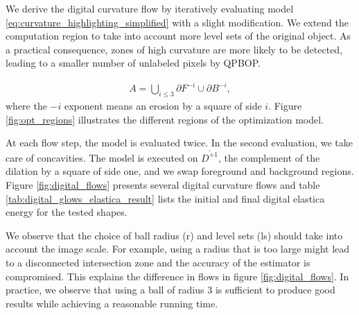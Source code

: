 \documentclass[runningheads]{llncs}
\begin{document}
We derive the digital curvature flow by iteratively evaluating model \eqref{eq:curvature_highlighting_simplified} with a
slight modification. We extend the computation region to take into account more level sets of the original object. As a
practical consequence, zones of high curvature are more likely to be detected, leading to a smaller number of unlabeled
pixels by QPBOP.

\begin{align*}
	A = \bigcup_{i\leq3}{ \partial F^{-i} \cup \partial B^{-i} },
\end{align*}
where the $-i$ exponent means an erosion by a square of side $i$. Figure \ref{fig:opt_regions} illustrates the different regions of the optimization model. 

At each flow step, the model is evaluated twice. In the second evaluation, we take care of concavities. The model is
executed on $\overline{D^{+1}}$, the complement of the dilation by a square of side one, and we swap foreground and
background regions. Figure \ref{fig:digital_flows} presents several digital curvature flows and table \ref{tab:digital_glows_elastica_result} lists the initial and final digital elastica energy for the tested shapes.

We observe that the choice of ball radius (r) and level sets (ls) should take into account the image scale. For example, using a
radius that is too large might lead to a disconnected intersection zone and the accuracy of the estimator is compromised. This
explains the difference in flows in figure \ref{fig:digital_flows}. In practice, we observe that using a ball of radius
$3$ is sufficient to produce good results while achieving a reasonable running time.
\end{document}

